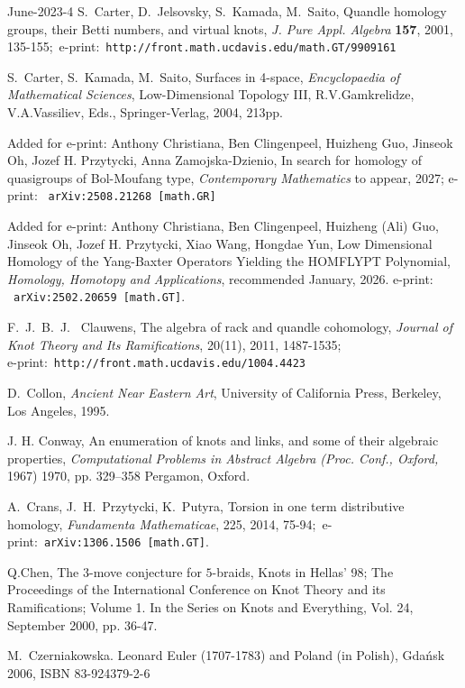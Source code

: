 \documentclass[12pt]{amsart}
\begin{document}
\begin{thebibliography}{June-2023-4}
S.~Carter, D.~Jelsovsky, S.~Kamada, M.~Saito,
Quandle homology groups, their Betti numbers, and virtual knots,
{\it J. Pure Appl. Algebra} \textbf{157}, 2001, 135-155;\
e-print:\ {\tt http://front.math.ucdavis.edu/math.GT/9909161}

S.~Carter, S.~Kamada, M.~Saito, Surfaces in 4-space, {\it Encyclopaedia
of Mathematical Sciences}, Low-Dimensional Topology III, R.V.Gamkrelidze,
V.A.Vassiliev, Eds., Springer-Verlag, 2004, 213pp.

 {\color{red} Added for e-print:} Anthony Christiana, Ben Clingenpeel, Huizheng Guo, Jinseok Oh, Jozef H. Przytycki, Anna Zamojska-Dzienio, 
In search for homology of quasigroups of Bol-Moufang type, 
{\it Contemporary Mathematics} to appear, 2027; e-print: \ {\tt arXiv:2508.21268 [math.GR] }

 {\color{red} Added for e-print:} Anthony Christiana, Ben Clingenpeel, Huizheng (Ali) Guo, Jinseok Oh, Jozef H. Przytycki, Xiao Wang, Hongdae Yun,
 Low Dimensional Homology of the Yang-Baxter Operators Yielding the HOMFLYPT Polynomial, {\it Homology, Homotopy and Applications}, recommended January, 2026.
 e-print: \ {\tt arXiv:2502.20659 [math.GT]}.
 
F.~J.~B.~J.~ Clauwens, The algebra of rack and quandle cohomology, {\it Journal of Knot Theory and Its Ramifications},
20(11), 2011, 1487-1535;\\
e-print:\ {\tt http://front.math.ucdavis.edu/1004.4423}

D.~Collon, {\it Ancient Near Eastern Art}, University of California Press,
Berkeley, Los Angeles, 1995.

J. H. Conway, An enumeration of knots and links, and some of their algebraic properties, {\it Computational Problems in Abstract Algebra (Proc. Conf., Oxford,} 1967) 1970, pp. 329–358 Pergamon, Oxford.

A.~Crans, J.~H.~Przytycki, K.~Putyra, Torsion in one term distributive homology,
{\it Fundamenta Mathematicae}, 225, 2014,  75-94;\
e-print:\ {\tt  arXiv:1306.1506 [math.GT]}.

Q.Chen, The $3$-move conjecture for $5$-braids,
Knots in Hellas' 98;
The Proceedings of the International Conference
on Knot Theory and its Ramifications; Volume 1.
In the Series on Knots and Everything, Vol. 24, September 2000,
pp. 36-47.

M.~Czerniakowska.
\newblock Leonard Euler (1707-1783) and Poland (in Polish),
\newblock Gda\'nsk 2006, ISBN 83-924379-2-6


\end{thebibliography}
\end{document}
